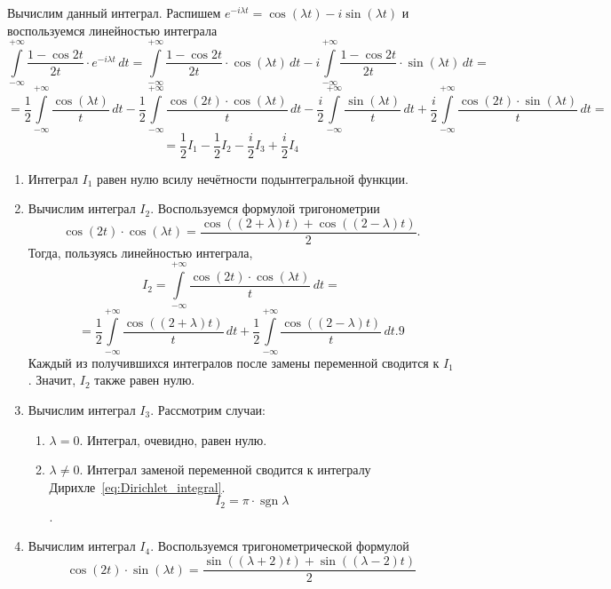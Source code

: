 \documentclass[a4paper, 11pt]{article}
\newcommand{\myint}[4]{\int\limits_{#1}^{#2}#3\,d#4}
\DeclareMathOperator{\sgn}{sgn}
\begin{document}
        Вычислим данный интеграл. Распишем $e^{-i\lambda t} = \cos(\lambda t) - i \sin(\lambda t)$ и воспользуемся линейностью интеграла
        $$    
        \myint{-\infty}{+\infty}{\frac{1 - \cos2t}{2t}\cdot e^{-i\lambda t}}{t} = \myint{-\infty}{+\infty}{\frac{1 - \cos2t}{2t}\cdot \cos(\lambda t)}{t} - i\myint{-\infty}{+\infty}{\frac{1 - \cos2t}{2t}\cdot \sin(\lambda t)}{t} =
        $$
        $$
            = \frac{1}{2}\myint{-\infty}{+\infty}{\frac{\cos(\lambda t)}{t}}{t}-\frac{1}{2}\myint{-\infty}{+\infty}{\frac{\cos(2t) \cdot \cos(\lambda t)}{t}}{t}- \frac{i}{2}\myint{-\infty}{+\infty}{\frac{\sin(\lambda t)}{t}} {t} +\frac{i}{2}\myint{-\infty}{+\infty}{\frac{\cos(2t)\cdot \sin(\lambda t)}{t}} {t} = 
        $$
        $$
            = \frac{1}{2}I_1 - \frac{1}{2}I_2 - \frac{i}{2}I_3 + \frac{i}{2}I_4
        $$
        \begin{enumerate}
            \item Интеграл $I_1$ равен нулю всилу нечётности подынтегральной функции.
            \item Вычислим интеграл $I_2$.
                Воспользуемся формулой тригонометрии
                $$
                    \cos(2t) \cdot \cos(\lambda t) = \frac{\cos((2+\lambda)t) + \cos((2-\lambda)t)}{2}.
                $$
                Тогда, пользуясь линейностью интеграла,
                $$
                    I_2 = \myint{-\infty}{+\infty}{\frac{\cos(2t) \cdot \cos(\lambda t)}{t}}{t} =
                $$
                $$
                    = \frac{1}{2}\myint{-\infty}{+\infty}{\frac{\cos((2+\lambda)t)}{t}} {t}+\frac{1}{2}\myint{-\infty}{+\infty}{\frac{\cos((2-\lambda)t)}{t}} {t}.9
                $$
                Каждый из получившихся интегралов после замены переменной сводится к $I_1$. Значит, $I_2$ также равен нулю.
            \item Вычислим интеграл $I_3$. Рассмотрим случаи:
                \begin{enumerate}
                    \item $\lambda = 0$. Интеграл, очевидно, равен нулю.
                    \item $\lambda \neq 0$. Интеграл заменой переменной сводится к интегралу Дирихле~\eqref{eq:Dirichlet_integral}. $$I_2 = \pi \cdot \sgn{\lambda}$$.
                \end{enumerate}
            \item Вычислим интеграл $I_4$. Воспользуемся тригонометрической формулой
                $$
                    \cos(2t)\cdot \sin(\lambda t) = \frac{\sin((\lambda+2)t) + \sin((\lambda-2)t)}{2}
$$
\end{enumerate}
\end{document}
